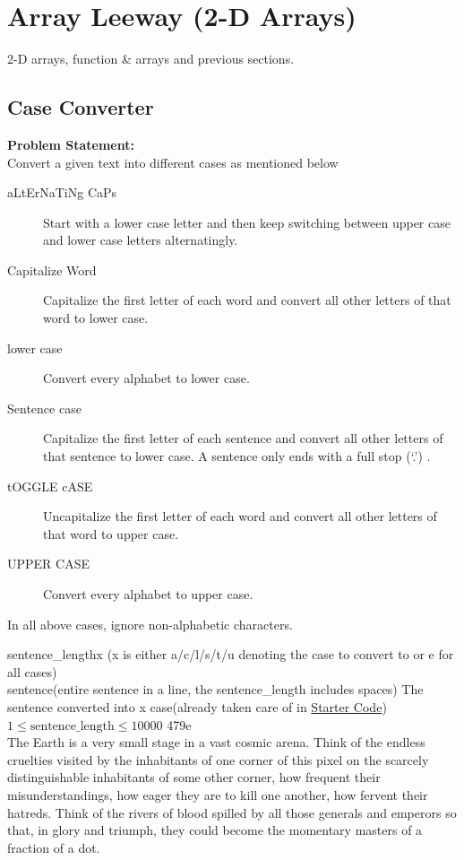 \recalctypearea
{\scriptsize
\section{Array Leeway (2-D Arrays)}
\begin{topics}
2-D arrays, function \& arrays and previous sections.
\end{topics}
\subsection{Case Converter}
\textbf{Problem Statement:}\\
Convert a given text into different cases as mentioned below
\begin{description}
	\item[aLtErNaTiNg CaPs] Start with a lower case letter and then keep switching between upper case and lower case letters alternatingly.
	\item[Capitalize Word] Capitalize the first letter of each word and convert all other letters of that word to lower case.
	\item[lower case] Convert every alphabet to lower case.
	\item[Sentence case] Capitalize the first letter of each sentence and convert all other letters of that sentence to lower case. A sentence only ends with a full stop (`.') .
	\item[tOGGLE cASE] Uncapitalize the first letter of each word and convert all other letters of that word to upper case.
	\item[UPPER CASE] Convert every alphabet to upper case.
\end{description}
\begin{note}
	In all above cases, ignore non-alphabetic characters.
\end{note}
\begin{testcases}
	{sentence\_length\quad x \hfill(x is either a/c/l/s/t/u denoting the case to convert to or e for all cases)\\
	sentence\hfill(entire sentence in a line, the sentence\_length includes spaces)}
	{The sentence converted into x case\hfill{(already taken care of in \href{https://github.com/paramrathour/CS-101/tree/main/Starter Codes/Case Converter.cpp}{Starter Code})}}
	{$1 \leq \text{sentence\_length} \leq 10000$}
	{479\quad e\\The Earth is a very small stage in a vast cosmic arena. Think of the endless cruelties visited by the inhabitants of one corner of this pixel on the scarcely distinguishable inhabitants of some other corner, how frequent their misunderstandings, how eager they are to kill one another, how fervent their hatreds. Think of the rivers of blood spilled by all those generals and emperors so that, in glory and triumph, they could become the momentary masters of a fraction of a dot.}

\end{testcases}}
